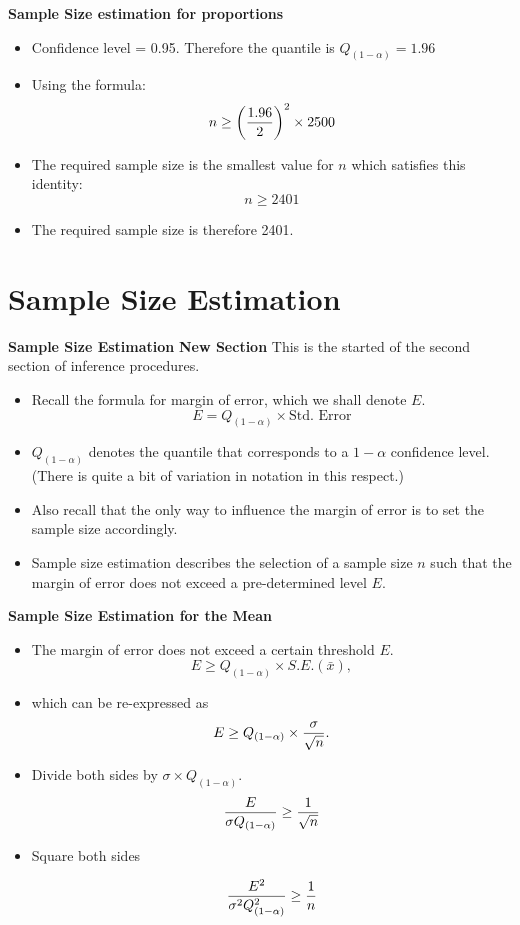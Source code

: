 
\textbf{Sample Size estimation for proportions}

\begin{itemize}
\item Confidence level = 0.95. Therefore the quantile is $Q_{(1-\alpha)} = 1.96$
\item Using the formula: \[ n \geq \left({1.96 \over 2 }\right)^2 \times 2500  \]
\item The required sample size is the smallest value for $n$ which satisfies this identity: \[ n \geq 2401  \]
\item The required sample size is therefore 2401.
\end{itemize}

\section{Sample Size Estimation}


\textbf{Sample Size Estimation}
\textbf{New Section} This is the started of the second section of inference procedures.
\begin{itemize} \item  Recall the formula for margin of error, which we shall denote $E$.
\[  E = Q_{(1-\alpha)} \times \mbox{Std. Error}\]

\item  $Q_{(1-\alpha)}$ denotes the quantile that corresponds to a $1-\alpha$ confidence level. (There is quite a bit of variation in notation in this respect.)
\item  Also recall that the only way to influence the margin of error is to set the sample size accordingly.

\item  Sample size estimation describes the selection of a sample size $n$ such that the margin of error does not exceed a pre-determined level $E$.
\end{itemize}



\textbf{Sample Size Estimation for the Mean}

\begin{itemize}

\item  The margin of error does not exceed a certain threshold $E$.
\[ E \geq Q_{(1-\alpha)} \times S.E.(\bar{x}), \]

\item  which can be re-expressed as
\[E \geq Q_{(1-\alpha)} \times {\sigma \over \sqrt{n} }.\]

\item  Divide both sides by $\sigma \times Q_{(1-\alpha)}$.
\[ \frac{E}{\sigma Q_{(1-\alpha)}} \geq {1 \over \sqrt{n} } \]

\item  Square both sides

\[ \frac{E^2}{\sigma^2 Q_{(1-\alpha)}^2} \geq {1 \over n } \]

\end{itemize}

